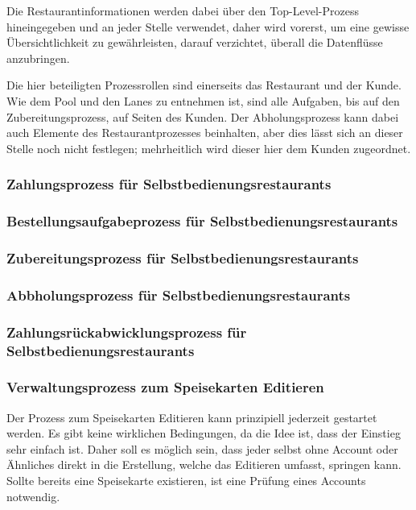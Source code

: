 Die Restaurantinformationen werden dabei über den Top-Level-Prozess hineingegeben und an jeder Stelle verwendet, daher wird vorerst, um eine gewisse Übersichtlichkeit zu gewährleisten, darauf verzichtet, überall die Datenflüsse anzubringen.

Die hier beteiligten Prozessrollen sind einerseits das Restaurant und der Kunde. Wie dem Pool und den Lanes zu entnehmen ist, sind alle Aufgaben, bis auf den Zubereitungsprozess, auf Seiten des Kunden. Der Abholungsprozess kann dabei auch Elemente des Restaurantprozesses beinhalten, aber dies lässt sich an dieser Stelle noch nicht festlegen; mehrheitlich wird dieser hier dem Kunden zugeordnet. 

\subsubsection{Zahlungsprozess für Selbstbedienungsrestaurants}


\subsubsection{Bestellungsaufgabeprozess für Selbstbedienungsrestaurants}
\subsubsection{Zubereitungsprozess für Selbstbedienungsrestaurants}
\subsubsection{Abbholungsprozess für Selbstbedienungsrestaurants}
\subsubsection{Zahlungsrückabwicklungsprozess für Selbstbedienungsrestaurants}

\subsubsection{Verwaltungsprozess zum Speisekarten Editieren}
Der Prozess zum Speisekarten Editieren kann prinzipiell jederzeit gestartet werden. Es gibt keine wirklichen Bedingungen, da die Idee ist, dass der Einstieg sehr einfach ist. Daher soll es möglich sein, dass jeder selbst ohne Account oder Ähnliches direkt in die Erstellung, welche das Editieren umfasst, springen kann. Sollte bereits eine Speisekarte existieren, ist eine Prüfung eines Accounts notwendig.

